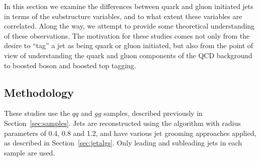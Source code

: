 In this section we examine the differences between quark and gluon initiated jets in terms of the substructure variables, and to what extent these variables are correlated. Along the way, we attempt to provide some theoretical understanding of these observations. The motivation for these studies comes not only from the desire to ``tag'' a jet as being quark or gluon initiated, but also from the point of view of understanding the quark and gluon components of the QCD background to boosted boson and boosted top tagging.  

\subsection{Methodology}

These studies use the $qq$ and $gg$ samples, described previously in Section~\ref{sec:samples}.
Jets are reconstructed using the \antikt algorithm with 
radius parameters of 0.4, 0.8 and 1.2, and have various
jet grooming approaches applied, as described in Section~\ref{sec:jetalgs}. 
Only leading and subleading jets in each sample are used. 

